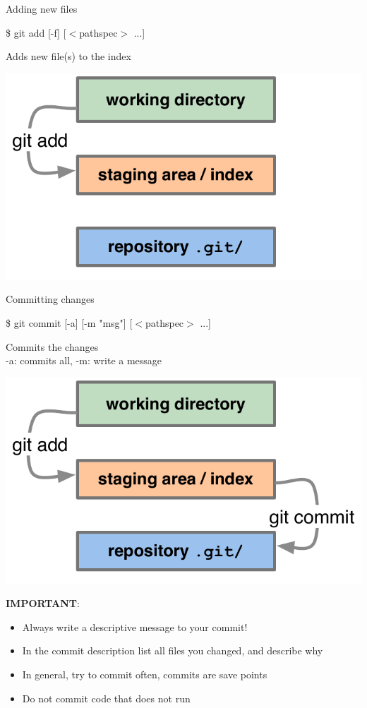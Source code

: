 \documentclass[10pt,xcolor=dvipsnames]{beamer}
\begin{document}
\begin{frame}{Adding new files}
\begin{block}{}
\$ git add [-f] [$<$pathspec$>$ ...]
\end{block}
Adds new file(s) to the index
\begin{center}
\includegraphics[scale=0.3]{diagrams_add_commit-02.pdf}
\end{center}
\end{frame}

\begin{frame}{Committing changes}
\begin{block}{}
\$ git commit [-a] [-m "msg"] [$<$pathspec$>$ ...]
\end{block}
Commits the changes\\
-a: commits all,
-m: write a message
\begin{center}
\includegraphics[scale=0.3]{diagrams_add_commit-03.pdf}
\end{center}
\pause
{\bf IMPORTANT}:
\begin{itemize}
\item Always write a descriptive message to your commit!
\item In the commit description list all files you changed, and describe why
\item In general, try to commit often, commits are save points
\item Do not commit code that does not run
\end{itemize}

\end{frame}
\end{document}

